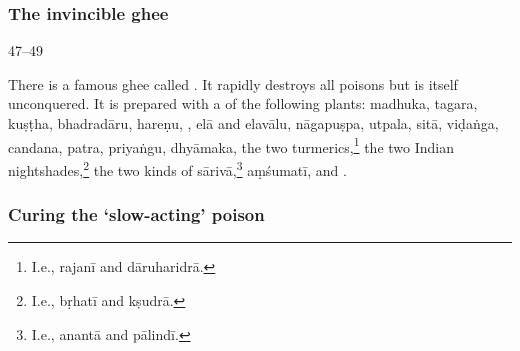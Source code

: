 \subsubsection{The invincible ghee}
    
  \begin{translation}
    
    \item[ 47--49]
    
    \label{ajeya} There is a famous ghee called . It
rapidly destroys all poisons but is itself unconquered. It is prepared with a
 of the following plants: %
\gls{madhuka},
\gls{tagara},
\gls{kuṣṭha},
\gls{bhadradāru},
\gls{hareṇu},
,
\gls{elā}
and \gls{elavālu},
\gls{nāgapuṣpa},
\gls{utpala},
\gls{sitā},
\gls{viḍaṅga},
\gls{candana},
\gls{patra},
\gls{priyaṅgu},
\gls{dhyāmaka},
the two turmerics,\footnote{I.e., \gls{rajanī} and \gls{dāruharidrā}.}
the two Indian nightshades,\footnote{I.e., \gls{bṛhatī} and \gls{kṣudrā}.}
the two kinds of \gls{sārivā},\footnote{I.e., \gls{anantā} and \gls{pālindī}.}
\gls{aṃśumatī},
and 
.
    
    \end{translation}

\subsubsection{Curing the `slow-acting' poison}
    

